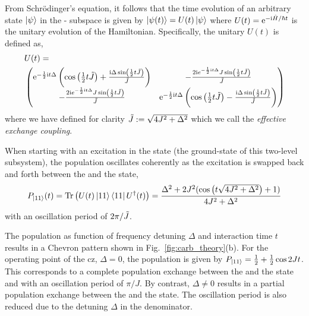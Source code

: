 From Schr\"odinger's equation, it follows that the time evolution of an arbitrary state $\ket{\psi}$ in the \oo-\tz{} subspace is given by $|\psi(t)\rangle = U(t)\ket{\psi}$ where $U(t) = \mathrm e^{-\mathrm i \hat H/\hbar t}$ is the unitary evolution of the Hamiltonian. Specifically, the unitary $U(t)$ is defined as,
\begin{equation}
\begin{split}
    &U(t) = \\
& \begin{pmatrix}
 \mathrm e^{-\frac{1}{2} \mathrm i t \Delta } \left(\cos \left(\frac{1}{2} t \Tilde{J} \right)+\frac{\mathrm i \Delta  \sin \left(\frac{1}{2} t \Tilde{J}\right)}{\Tilde{J}}\right) & -\frac{2 \mathrm i e^{-\frac{1}{2} \mathrm i t
   \Delta } J \sin \left(\frac{1}{2} t \Tilde{J}\right)}{\Tilde{J}} \\
 -\frac{2 \mathrm i e^{-\frac{1}{2} \mathrm i t \Delta } J \sin \left(\frac{1}{2} t \Tilde{J}\right)}{\Tilde{J}} & \mathrm e^{-\frac{1}{2} \mathrm i t \Delta }
   \left(\cos \left(\frac{1}{2} t \Tilde{J}\right)-\frac{\mathrm i \Delta 
   \sin \left(\frac{1}{2} t \Tilde{J}\right)}{\Tilde{J}}\right) \\
\end{pmatrix}
\end{split}
\end{equation}
where we have defined for clarity $\Tilde{J} := \sqrt{4J^2+\Delta^2}$ which we call the \textit{effective exchange coupling}.

When starting with an excitation in the \oo{} state (the ground-state of this two-level subsystem), the \oo{} population oscillates coherently as the excitation is swapped back and forth between the \oo{} and the \tz{} state,
\begin{equation}
P_{\ket{11}{}}(t) = \mathrm{Tr}\left(U(t)\ket{11}\bra{11}U^\dag(t)\right) = \frac{\Delta ^2+2 J^2 (\cos \left(t \sqrt{4J^2+\Delta^2}\right)+1)}{4J^2+\Delta^2}
\end{equation}
with an oscillation period of $2\pi/\Tilde{J}$. 

The population as function of frequency detuning $\Delta$ and interaction time $t$ results in a Chevron pattern shown in Fig.~\ref{fig:carb_theory}(b). For the operating point of the \gls{cz}, $\Delta = 0$, the population is given by $P_{\ket{11}{}} = \frac{1}{2} + \frac{1}{2}\cos{2Jt}$. This corresponds to a complete population exchange between the \oo{} and the \tz{} state and with an oscillation period of $\pi/J$. By contrast, $\Delta \neq 0$ results in a partial population exchange between the \oo{} and the \tz{} state. The oscillation period is also reduced due to the detuning $\Delta$ in the denominator. 

